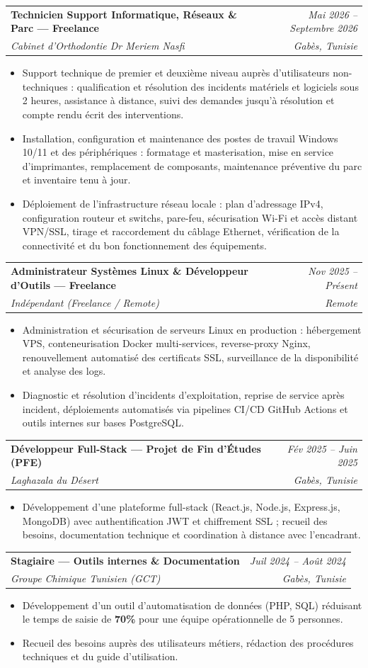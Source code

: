 \documentclass[letterpaper,9pt]{article}
\makeatletter
\newcommand{\resumeItem}[1]{\item\small{#1}}
\newcommand{\resumeSubheading}[4]{
  \vspace{-1pt}\item
  \begin{tabular*}{0.97\textwidth}[t]{l@{\extracolsep{\fill}}r}
    \textbf{#1} & \textit{\color{greytext}#2} \\
    \textit{\small\color{greytext} #3} & \textit{\small\color{greytext} #4}
  \end{tabular*}\vspace{-2pt}
}
\newcommand{\resumeItemListStart}{\begin{itemize}[leftmargin=0.24in, label={}, itemsep=0.9pt, topsep=1.2pt, parsep=0pt]}
\newcommand{\resumeItemListEnd}{\end{itemize}\vspace{-2pt}}
\makeatother
\begin{document}
  \resumeSubheading{Technicien Support Informatique, Réseaux \& Parc --- Freelance}{Mai 2026 -- Septembre 2026}{Cabinet d'Orthodontie Dr Meriem Nasfi}{Gabès, Tunisie}
    \resumeItemListStart
      \resumeItem{Support technique de premier et deuxième niveau auprès d'utilisateurs non-techniques : qualification et résolution des incidents matériels et logiciels sous 2 heures, assistance à distance, suivi des demandes jusqu'à résolution et compte rendu écrit des interventions.}
      \resumeItem{Installation, configuration et maintenance des postes de travail Windows 10/11 et des périphériques : formatage et masterisation, mise en service d'imprimantes, remplacement de composants, maintenance préventive du parc et inventaire tenu à jour.}
      \resumeItem{Déploiement de l'infrastructure réseau locale : plan d'adressage IPv4, configuration routeur et switchs, pare-feu, sécurisation Wi-Fi et accès distant VPN/SSL, tirage et raccordement du câblage Ethernet, vérification de la connectivité et du bon fonctionnement des équipements.}
    \resumeItemListEnd

  \resumeSubheading{Administrateur Systèmes Linux \& Développeur d'Outils --- Freelance}{Nov 2025 -- Présent}{Indépendant (Freelance / Remote)}{Remote}
    \resumeItemListStart
      \resumeItem{Administration et sécurisation de serveurs Linux en production : hébergement VPS, conteneurisation Docker multi-services, reverse-proxy Nginx, renouvellement automatisé des certificats SSL, surveillance de la disponibilité et analyse des logs.}
      \resumeItem{Diagnostic et résolution d'incidents d'exploitation, reprise de service après incident, déploiements automatisés via pipelines CI/CD GitHub Actions et outils internes sur bases PostgreSQL.}
    \resumeItemListEnd

  \resumeSubheading{Développeur Full-Stack --- Projet de Fin d'Études (PFE)}{Fév 2025 -- Juin 2025}{Laghazala du Désert}{Gabès, Tunisie}
    \resumeItemListStart
      \resumeItem{Développement d'une plateforme full-stack (React.js, Node.js, Express.js, MongoDB) avec authentification JWT et chif\hspace{0pt}frement SSL ; recueil des besoins, documentation technique et coordination à distance avec l'encadrant.}
    \resumeItemListEnd

  \resumeSubheading{Stagiaire --- Outils internes \& Documentation}{Juil 2024 -- Août 2024}{Groupe Chimique Tunisien (GCT)}{Gabès, Tunisie}
    \resumeItemListStart
      \resumeItem{Développement d'un outil d'automatisation de données (PHP, SQL) réduisant le temps de saisie de \textbf{70\%} pour une équipe opérationnelle de 5 personnes.}
      \resumeItem{Recueil des besoins auprès des utilisateurs métiers, rédaction des procédures techniques et du guide d'utilisation.}
    \resumeItemListEnd
\end{document}

